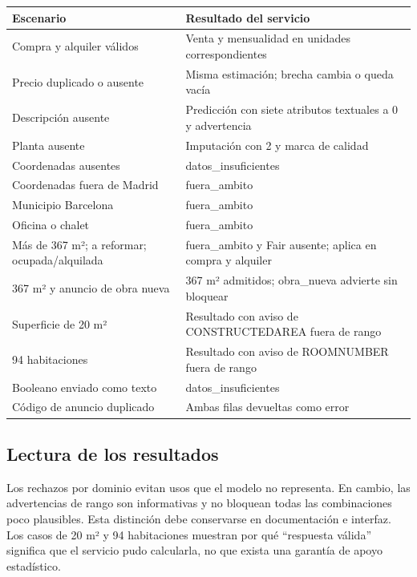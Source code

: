 \documentclass[11pt,a4paper]{article}
\newcommand{\thead}[1]{\textbf{#1}}
\newcounter{anexo}
\newcounter{anexosub}[anexo]
\begin{document}
\begin{center}
\begin{tabularx}{\linewidth}{@{}L L@{}}
\toprule
\thead{Escenario} & \thead{Resultado del servicio} \\
\midrule
Compra y alquiler válidos & Venta y mensualidad en unidades correspondientes \\
Precio duplicado o ausente & Misma estimación; brecha cambia o queda vacía \\
Descripción ausente & Predicción con siete atributos textuales a 0 y advertencia \\
Planta ausente & Imputación con 2 y marca de calidad \\
Coordenadas ausentes & datos\_insuficientes \\
Coordenadas fuera de Madrid & fuera\_ambito \\
Municipio Barcelona & fuera\_ambito \\
Oficina o chalet & fuera\_ambito \\
Más de 367 m²; a reformar; ocupada/alquilada & fuera\_ambito y Fair ausente; aplica en compra y alquiler \\
367 m² y anuncio de obra nueva & 367 m² admitidos; obra\_nueva advierte sin bloquear \\
Superficie de 20 m² & Resultado con aviso de CONSTRUCTEDAREA fuera de rango \\
94 habitaciones & Resultado con aviso de ROOMNUMBER fuera de rango \\
Booleano enviado como texto & datos\_insuficientes \\
Código de anuncio duplicado & Ambas filas devueltas como error \\
\bottomrule
\end{tabularx}
\end{center}

%
\subsection*{\theanexo\hspace{0.3em}\hspace{0.45em}Lectura de los resultados}

Los rechazos por dominio evitan usos que el modelo no representa. En cambio, las advertencias de rango son informativas y no bloquean todas las combinaciones poco plausibles. Esta distinción debe conservarse en documentación e interfaz. Los casos de 20 m² y 94 habitaciones muestran por qué ``respuesta válida'' significa que el servicio pudo calcularla, no que exista una garantía de apoyo estadístico.
\end{document}
